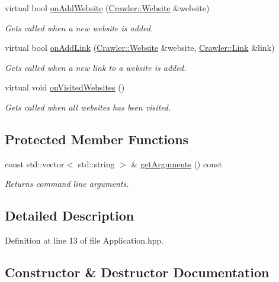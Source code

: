 \begin{DoxyCompactItemize}
virtual bool \hyperlink{class_crawler_1_1_application_abdbdf57a6da5d52a8f7b4fb0e87fb422}{on\+Add\+Website} (\hyperlink{class_crawler_1_1_website}{Crawler\+::\+Website} \&website)
\begin{DoxyCompactList}\small\item\em Gets called when a new website is added. \end{DoxyCompactList}\item 
virtual bool \hyperlink{class_crawler_1_1_application_a97037c34bec5f50bd7bf1f56456ea555}{on\+Add\+Link} (\hyperlink{class_crawler_1_1_website}{Crawler\+::\+Website} \&website, \hyperlink{class_crawler_1_1_link}{Crawler\+::\+Link} \&link)
\begin{DoxyCompactList}\small\item\em Gets called when a new link to a website is added. \end{DoxyCompactList}\item 
virtual void \hyperlink{class_crawler_1_1_application_a45cd98a249e0f0b2755d1acf94c7fa1a}{on\+Visited\+Websites} ()
\begin{DoxyCompactList}\small\item\em Gets called when all websites has been visited. \end{DoxyCompactList}\end{DoxyCompactItemize}
\subsection*{Protected Member Functions}
\begin{DoxyCompactItemize}
\item 
const std\+::vector$<$ std\+::string $>$ \& \hyperlink{class_crawler_1_1_application_ad22222189cada456cad856bcce6b8f32}{get\+Arguments} () const 
\begin{DoxyCompactList}\small\item\em Returns command line arguments. \end{DoxyCompactList}\end{DoxyCompactItemize}


\subsection{Detailed Description}


Definition at line 13 of file Application.\+hpp.



\subsection{Constructor \& Destructor Documentation}
\hypertarget{class_crawler_1_1_application_acf656ce91b631690e20404f6b4d01f7f}{}
